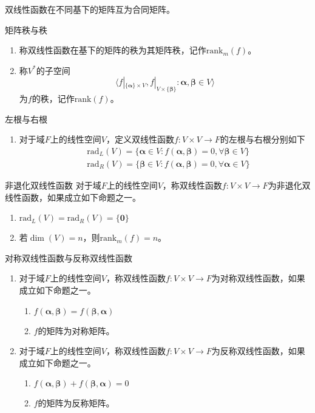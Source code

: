 \documentclass[lang = cn, scheme = chinese, thmcnt = section]{elegantbook}
\newcommand{\bs}{\boldsymbol}          %
\newcommand{\rank}{\text{rank}}        %
\begin{document}
\begin{remark}
	双线性函数在不同基下的矩阵互为合同矩阵。
\end{remark}

\begin{definition}{矩阵秩与秩}
	\begin{enumerate}
		\item 称双线性函数在基下的矩阵的秩为其矩阵秩，记作$\rank_m(f)$。
		\item 称$V^*$的子空间%
		$$
		\langle f|_{\{\bs{\alpha}\}\times V},f|_{V\times\{\bs{\beta}\}}:\bs{\alpha},\bs{\beta}\in V \rangle
		$$
		为$f$的秩，记作$\rank(f)$。
	\end{enumerate}
\end{definition}

\begin{definition}{左根与右根}
	\begin{enumerate}
		\item 对于域$F$上的线性空间$V$，定义双线性函数$f:V\times V\to F$的左根与右根分别如下
		\begin{align*}
			& \text{rad}_L(V)=\{ \bs{\alpha}\in V:f(\bs{\alpha},\bs{\beta})=0,\forall\bs{\beta}\in V \} \\
			& \text{rad}_R(V)=\{ \bs{\beta}\in V:f(\bs{\alpha},\bs{\beta})=0,\forall\bs{\alpha}\in V \}
		\end{align*}
	\end{enumerate}
\end{definition}

\begin{definition}{非退化双线性函数}
	对于域$F$上的线性空间$V$，称双线性函数$f:V\times V\to F$为非退化双线性函数，如果成立如下命题之一。
	\begin{enumerate}
		\item $\text{rad}_L(V)=\text{rad}_R(V)=\{ \bs{0} \}$
		\item 若$\dim(V)=n$，则$\rank_m(f)=n$。
	\end{enumerate}
\end{definition}

\begin{definition}{对称双线性函数与反称双线性函数}
	\begin{enumerate}
		\item 对于域$F$上的线性空间$V$，称双线性函数$f:V\times V\to F$为对称双线性函数，如果成立如下命题之一。
		\begin{enumerate}
			\item $f(\bs{\alpha},\bs{\beta})=f(\bs{\beta},\bs{\alpha})$
			\item $f$的矩阵为对称矩阵。
		\end{enumerate}
		\item 对于域$F$上的线性空间$V$，称双线性函数$f:V\times V\to F$为反称双线性函数，如果成立如下命题之一。
		\begin{enumerate}
			\item $f(\bs{\alpha},\bs{\beta})+f(\bs{\beta},\bs{\alpha})=0$
			\item $f$的矩阵为反称矩阵。
		\end{enumerate}
	\end{enumerate}
\end{definition}
\end{document}
